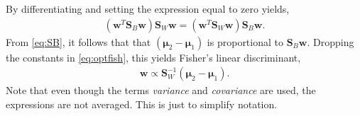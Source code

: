 By differentiating and setting the expression equal to zero yields,
\begin{align}
  \label{eq:optfish} 
  (\mathbf{w}^T \mathbf{S}_B \mathbf{w})\mathbf{S}_W \mathbf{w} = (\mathbf{w}^T \mathbf{S}_W \mathbf{w})\mathbf{S}_B \mathbf{w}.
\end{align}
From \eqref{eq:SB}, it follows that that $(\bm{\mu}_2 - \bm{\mu}_1)$ is proportional to $\mathbf{S}_B \mathbf{w}$. Dropping the constants in \eqref{eq:optfish}, this yields Fisher's linear discriminant,
\begin{align}
  \mathbf{w} \propto \mathbf{S}_W^{-1} (\bm \mu_2 - \bm \mu_1).
\end{align}
Note that even though the terms \textit{variance} and \textit{covariance} are used, the expressions are not averaged. This is just to simplify notation. 
\\
\\
